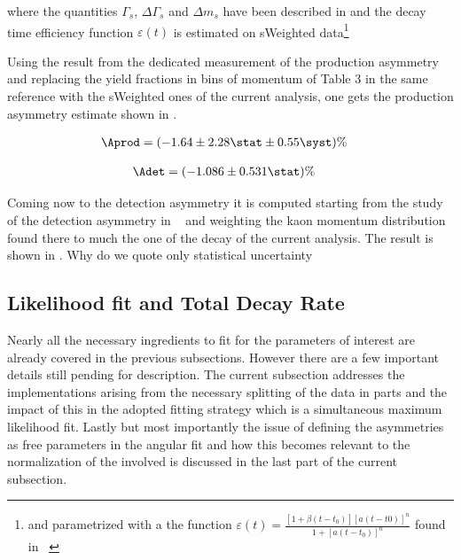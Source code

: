 \noindent where the quantities $\Gamma_s$, $\Delta\Gamma_s$ and $\Delta m_s$ have been described in 
and the decay time efficiency function $\varepsilon(t)$ is estimated on sWeighted \BsJpsiKst 
data\footnote{and parametrized with a the function $\varepsilon(t)= \frac{[1+\beta(t-t_0)][a(t-t0)]^n}{1+[a(t-t_0)]^n}$ found in ~\cite{LHCb-PAPER-2014-053}}

Using the result from the dedicated \lhcb measurement of the production asymmetry ~\cite{LHCb-PAPER-2014-042}
and replacing the yield fractions in bins of \Bs momentum of Table 3 in the same reference with the sWeighted \BsJpsiKst ones of the current analysis, 
one gets the production asymmetry estimate shown in .

\begin{align}
\Aprod &= (-1.64 \pm 2.28 \stat \pm 0.55 \syst)\%
\label{prod_assym}
\end{align}

\begin{align}
\Adet &= (-1.086 \pm 0.531 \stat)\%
\label{det_assym}
\end{align}
 
\noindent Coming now to the detection asymmetry it is computed starting from the \lhcb study of the detection asymmetry
in ~\cite{LHCb-PAPER-2014-013} and weighting the kaon momentum distribution found there to much the one of the \BsJpsiKst
decay of the current analysis. The result is shown in . {\color{red} Why do we quote only statistical uncertainty}

\subsection{Likelihood fit and Total Decay Rate}
\label{Total_Decay_Rate}

Nearly all the necessary ingredients to fit for the parameters of interest are already covered in the previous subsections.
However there are a few important details still pending for description. The current subsection addresses the 
implementations arising from the necessary splitting of the data in parts and the impact of this in the adopted
fitting strategy which is a simultaneous maximum likelihood fit. Lastly but most importantly the issue of defining the \ACP 
asymmetries as free parameters in the angular fit and how this becomes relevant to the normalization of the \pdfs
involved is discussed in the last part of the current subsection.

